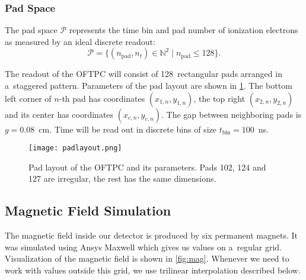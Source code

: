 			
			\subsubsection{Pad Space}
				The pad space $\mathcal{P}$ represents the time bin and pad number of ionization electrons as measured by an ideal discrete readout:
					\begin{equation}
						\mathcal{P} = \{(n_\text{pad},n_t)\in\mathbb{N}^2 \mid n_\text{pad}\leq128\}.
					\end{equation}
				
				The readout of the \ac{OFTPC} will consist of 128~rectangular pads arranged in a~staggered pattern. Parameters of the pad layout are shown in \cref{fig:padlayout}. The bottom left corner of $n$\nobreakdash-th pad has coordinates $(x_{1,n},y_{1,n})$, the  top right $(x_{2,n},y_{2,n})$ and its center has coordinates $(x_{c,n},y_{c,n})$. The gap between neighboring pads is $g=0.08$~cm. Time will be read out in discrete bins of size $t_\text{bin}=100$~ns.
			
				\begin{figure}[H]
					\centering
					\texttt{[image: padlayout.png]}
					\caption{Pad layout of the \ac{OFTPC} and its parameters. Pads 102, 124 and 127 are irregular, the rest has the same dimensions.}
					\label{fig:padlayout}
				\end{figure}
		
		\subsection{Magnetic Field Simulation}
		\label{sec:mag}
			The magnetic field inside our detector is produced by six permanent magnets. It was simulated using Ansys Maxwell which gives us values on a~regular grid. Visualization of the magnetic field is shown in \cref{fig:mag}. Whenever we need to work with values outside this grid, we use trilinear interpolation described below.
			
